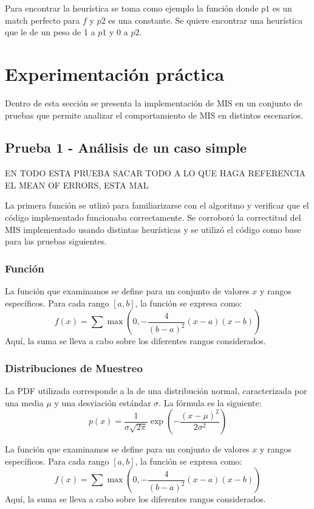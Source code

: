 \documentclass{article}
\begin{document}
Para encontrar la heurística se toma como ejemplo la función donde $p1$ es un match perfecto para $f$ y $p2$ es una constante.
Se quiere encontrar una heurística que le de un peso de 1 a $p1$ y 0 a $p2$.

\section{Experimentación práctica}

Dentro de esta sección se presenta la implementación de MIS en un conjunto de pruebas que permite analizar el comportamiento de MIS en distintos escenarios.

\subsection{Prueba 1 - Análisis de un caso simple}
\color{red}
EN TODO ESTA PRUEBA SACAR TODO A LO QUE HAGA REFERENCIA EL MEAN OF ERRORS, ESTA MAL
\color{black}

La primera función se utlizó para familiarizarse con el algoritmo y verificar que el código implementado funcionaba correctamente.
Se corroboró la correctitud del MIS implementado usando distintas heurísticas y se utilizó el código como base para las pruebas siguientes.

\subsubsection{Función}
La función que examinamos se define para un conjunto de valores \( x \) y rangos específicos. Para cada rango \( [a, b] \), la función se expresa como:
\begin{equation}
f(x) = \sum \max\left(0, -\frac{4}{(b - a)^2} (x - a)(x - b)\right)
\end{equation}
Aquí, la suma se lleva a cabo sobre los diferentes rangos considerados.

\subsubsection{Distribuciones de Muestreo}
La PDF utilizada corresponde a la de una distribución normal, caracterizada por una media \( \mu \) y una desviación estándar \( \sigma \). La fórmula es la siguiente:
\begin{equation}
p(x) = \frac{1}{\sigma \sqrt{2\pi}} \exp\left(-\frac{(x - \mu)^2}{2\sigma^2}\right)
\end{equation}

La función que examinamos se define para un conjunto de valores \( x \) y rangos específicos. Para cada rango \( [a, b] \), la función se expresa como:
\begin{equation}
f(x) = \sum \max\left(0, -\frac{4}{(b - a)^2} (x - a)(x - b)\right)
\end{equation}
Aquí, la suma se lleva a cabo sobre los diferentes rangos considerados.
\end{document}
